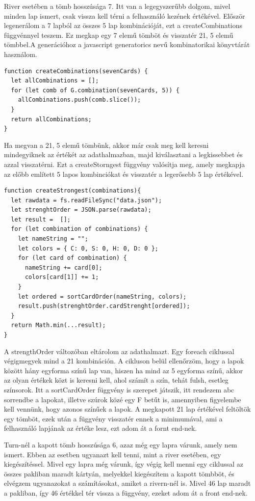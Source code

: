 River esetében a tömb hosszúsága 7. Itt van a legegyszerűbb dolgom, mivel minden lap ismert, csak vissza kell térni a felhasználó kezének értékével. Először legenerálom a 7 lapból az összes 5 lap kombinációját, ezt a createCombinations függvénnyel teszem. Ez megkap egy 7 elemű tömböt és visszatér 21, 5 elemű tömbbel.A generációhoz a javascript generatorics nevű kombinatorikai könyvtárát használom.

\begin{lstlisting}[style=htmlcssjs]
function createCombinations(sevenCards) {
  let allCombinations = [];
  for (let comb of G.combination(sevenCards, 5)) {
    allCombinations.push(comb.slice());
  }
  return allCombinations;
}
\end{lstlisting}

Ha megvan a 21, 5 elemű tömbünk, akkor már csak meg kell keresni mindegyiknek az értékét az adathalmazban, majd kiválasztani a legkissebbet és azzal visszatérni. Ezt a createStorngest függvény valósítja meg, amely megkapja az előbb említett 5 lapos kombinciókat és visszatér a legerősebb 5 lap értékével.

\begin{lstlisting}[style=htmlcssjs]
function createStrongest(combinations){
  let rawdata = fs.readFileSync("data.json");
  let strenghtOrder = JSON.parse(rawdata);
  let result =  [];
  for (let combination of combinations) {
    let nameString = "";
    let colors = { C: 0, S: 0, H: 0, D: 0 };
    for (let card of combination) {
      nameString += card[0];
      colors[card[1]] += 1;
    }
    let ordered = sortCardOrder(nameString, colors);
    result.push(strenghtOrder.cardStrenght[ordered]);
  }
  return Math.min(...result);
}
\end{lstlisting}

A strengthOrder változóban eltárolom az adathalmazt. Egy foreach ciklussal végigmegyek mind a 21 kombináción. A cikluson belül ellenőrzöm, hogy a lapok között hány egyforma színű lap van, hiszen ha mind az 5 egyforma színű, akkor az olyan értékek közt is keresni kell, ahol számít a szín, tehát fulsh, esetleg színsorok. Itt a sortCardOrder függvény is szerepet játszik, itt rendezem abc sorrendbe a lapokat, illetve szúrok közé egy F betűt is, amennyiben figyelembe kell vennünk, hogy azonos színűek a lapok. A megkapott 21 lap értékével feltöltök egy tömböt, ezek után a függvény visszatér ennek a minimumával, ami a felhasználó lapjának az értéke lesz, ezt adom át a fornt end-nek.

Turn-nél a kapott tömb hosszúsága 6, azaz még egy lapra várunk, amely nem ismert. Ebben az esetben ugyanazt kell tenni, mint a river esetében, egy kiegészítéssel. Mivel egy lapra még várunk, így végig kell menni egy ciklussal az összes pakliban maradt kártyán, melyekkel kiegészítem a kapott tömbböt, és elvégzem ugyanazokat a számításokat, amiket a rivern-nél is. Mivel 46 lap maradt a pakliban, így 46 értékkel tér vissza a függvény, ezeket adom át a front end-nek.

